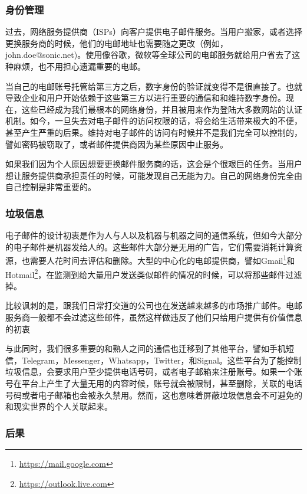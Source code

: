 \documentclass{article}
\begin{document}
\subsubsection{身份管理}

过去，网络服务提供商（ISPs）向客户提供电子邮件服务。当用户搬家，或者选择更换服务商的时候，他们的电邮地址也需要随之更改（例如，john.doe@sonic.net)。使用像谷歌，微软等全球公司的电邮服务就给用户省去了这种麻烦，也不用担心遗漏重要的电邮。

当自己的电邮账号托管给第三方之后，数字身份的验证就变得不是很直接了。也就导致企业和用户开始依赖于这些第三方以进行重要的通信和和维持数字身份。现在，这些已经成为我们最根本的网络身份，并且被用来作为登陆大多数网站的认证机制。如今，一旦失去对电子邮件的访问权限的话，将会给生活带来极大的不便，甚至产生严重的后果。维持对电子邮件的访问有时候并不是我们完全可以控制的，譬如密码被窃取了，或者邮件提供商因为某些原因中止服务。

如果我们因为个人原因想要更换邮件服务商的话，这会是个很艰巨的任务。当用户想让服务提供商承担责任的时候，可能发现自己无能为力。自己的网络身份完全由自己控制是非常重要的。

\subsubsection{垃圾信息}

电子邮件的设计初衷是作为人与人以及机器与机器之间的通信系统，但如今大部分的电子邮件是机器发给人的。这些邮件大部分是无用的广告，它们需要消耗计算资源，也需要人花时间去评估和删除。大型的中心化的电邮提供商，譬如Gmail\footnote{\url{https://mail.google.com}}和Hotmail\footnote{\url{https://outlook.live.com}}，在监测到给大量用户发送类似邮件的情况的时候，可以将那些邮件过滤掉。


比较讽刺的是，跟我们日常打交道的公司也在发送越来越多的市场推广邮件。电邮服务商一般都不会过滤这些邮件，虽然这样做违反了他们只给用户提供有价值信息的初衷

与此同时，我们很多重要的和熟人之间的通信也迁移到了其他平台，譬如手机短信，Telegram，Messenger，Whatsapp，Twitter，和Signal。这些平台为了能控制垃圾信息，会要求用户至少提供电话号码，或者电子邮箱来注册账号。如果一个账号在平台上产生了大量无用的内容时候，账号就会被限制，甚至删除，关联的电话号码或者电子邮箱也会被永久禁用。然而，这也意味着屏蔽垃圾信息会不可避免的和现实世界的个人关联起来。

\subsubsection{后果}
\end{document}
